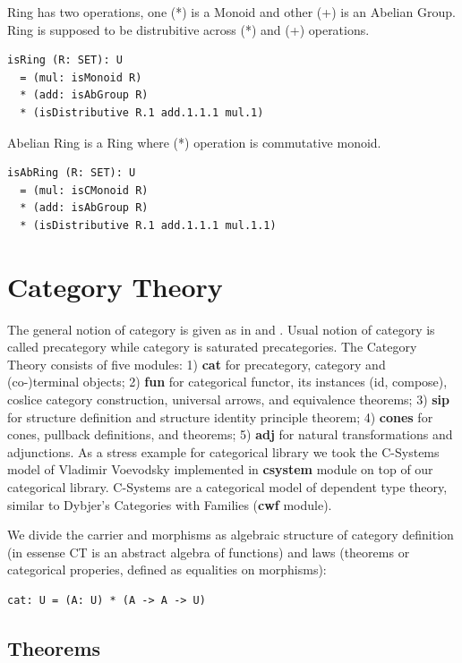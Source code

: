 \documentclass{article}
\begin{document}
Ring has two operations, one (*) is a Monoid and other (+) is an Abelian Group.
Ring is supposed to be distrubitive across (*) and (+) operations.

\begin{lstlisting}[mathescape=true]
isRing (R: SET): U
  = (mul: isMonoid R)
  * (add: isAbGroup R)
  * (isDistributive R.1 add.1.1.1 mul.1)
\end{lstlisting}

Abelian Ring is a Ring where (*) operation is commutative monoid.

\begin{lstlisting}[mathescape=true]
isAbRing (R: SET): U
  = (mul: isCMonoid R)
  * (add: isAbGroup R)
  * (isDistributive R.1 add.1.1.1 mul.1.1)
\end{lstlisting}

\section{Category Theory}

The general notion of category is given as in \cite{Shulman15} and \cite{HoTT}.
Usual notion of category is called precategory while category is saturated precategories.
The Category Theory consists of five modules: 1) {\bf cat} for precategory, category and (co-)terminal objects;
2) {\bf fun} for categorical functor, its instances (id, compose), coslice category construction,
universal arrows, and equivalence theorems; 3) {\bf sip} for structure definition and
structure identity principle theorem; 4) {\bf cones} for cones, pullback definitions, and theorems;
5) {\bf adj} for natural transformations and adjunctions. As a stress example for categorical library
we took the C-Systems model of Vladimir Voevodsky implemented in {\bf csystem} module on
top of our categorical library. C-Systems are a categorical model of dependent type theory,
similar to Dybjer's Categories with Families ({\bf cwf} module).

We divide the carrier and morphisms as algebraic structure of category
definition (in essense CT is an abstract algebra of functions) and laws (theorems
or categorical properies, defined as equalities on morphisms):

\begin{lstlisting}[mathescape=true]
cat: U = (A: U) * (A -> A -> U)
\end{lstlisting}

\subsection{Theorems}
\end{document}
